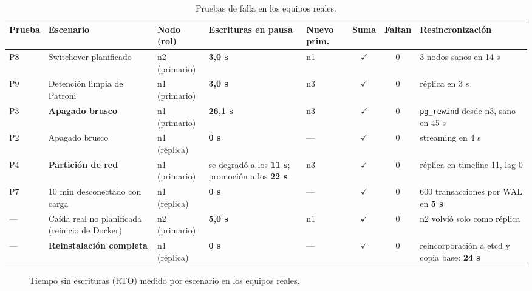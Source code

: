 \documentclass[11pt,a4paper]{article}
\newcommand{\cod}[1]{\texttt{#1}}
\newcommand{\ok}{\textcolor{verde}{\ensuremath{\checkmark}}}
\begin{document}
\begin{table}[H]
\centering
\scriptsize
\caption{Pruebas de falla en los equipos reales.}
\label{tab:pruebas}
\begin{tabularx}{\textwidth}{@{}lL{2.2cm}L{1.45cm}L{2.4cm}L{0.95cm}ccY@{}}
\toprule
\textbf{Prueba} & \textbf{Escenario} & \textbf{Nodo (rol)} & \textbf{Escrituras en pausa} & \textbf{Nuevo prim.} & \textbf{Suma} & \textbf{Faltan} & \textbf{Re\-sincronización} \\
\midrule
P8 & Switchover planificado & n2 (primario) & \textbf{3,0 s} & n1 & \ok & 0 & 3 nodos sanos en 14 s \\
P9 & Detención limpia de Patroni & n1 (primario) & \textbf{3,0 s} & n3 & \ok & 0 & réplica en 3 s \\
P3 & \textbf{Apagado brusco} & n1 (primario) & \textbf{26,1 s} & n3 & \ok & 0 & \cod{pg\_rewind} desde n3, sano en 45 s \\
P2 & Apagado brusco & n1 (réplica) & \textbf{0 s} & --- & \ok & 0 & streaming en 4 s \\
P4 & \textbf{Partición de red} & n1 (primario) & se degradó a los \textbf{11 s}; promoción a los \textbf{22 s} & n3 & \ok & 0 & réplica en timeline 11, lag 0 \\
P7 & 10 min desconectado con carga & n1 (réplica) & \textbf{0 s} & --- & \ok & 0 & 600 transacciones por WAL en \textbf{5 s} \\
--- & Caída real no planificada (reinicio de Docker) & n2 (primario) & \textbf{5,0 s} & n1 & \ok & 0 & n2 volvió solo como réplica \\
--- & \textbf{Reinstalación completa} & n1 (réplica) & \textbf{0 s} & --- & \ok & 0 & reincorporación a etcd y copia base: \textbf{24 s} \\
\bottomrule
\end{tabularx}
\end{table}

\begin{figure}[H]
\centering
{}
\caption{Tiempo sin escrituras (RTO) medido por escenario en los equipos reales.}
\label{fig:rto}
\end{figure}
\end{document}
